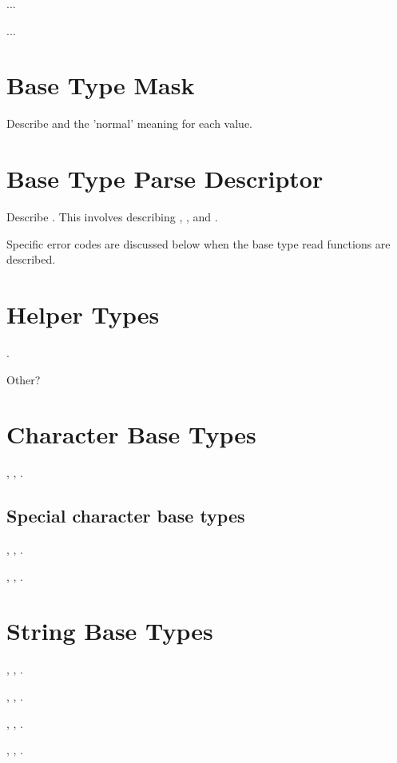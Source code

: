  ... 

 ... 

\section{Base Type Mask}
\label{sec:base-type-mask}

Describe \PDCbasem{} and the 'normal' meaning for each value.

\section{Base Type Parse Descriptor}
\label{sec:base-type-parse-descriptor}

Describe \PDCbasepd{}.  This involves describing \PDCloct{}, \PDCpost{},
and \PDCerrCodet{}.  

Specific error codes are discussed below
when the base type read functions are described.

\section{Helper Types}

\PDCregexpt{}.

Other?

\section{Character Base Types}
, , .

\subsection{Special character base types}

, , .

, , .

\section{String Base Types}

, , .

, , .

, , .

, , .

